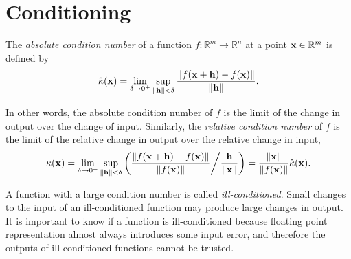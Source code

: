 
\section*{Conditioning} %

The \emph{absolute condition number} of a function $f: \mathbb{R}^m \rightarrow \mathbb{R}^n$ at a point $\mathbf{x}\in\mathbb{R}^m$ is defined by
\begin{equation}
\hat{\kappa} (\mathbf{x}) = \lim_{\delta \rightarrow 0^+} \sup_{\left\lVert\mathbf{h}\right\rVert < \delta} { \frac{\left\lVert f(\mathbf{x} + \mathbf{h} ) - f(\mathbf{x})\right\rVert}{\left\lVert\mathbf{h}\right\rVert} }.
\label{eq:absolute-condition-number}
\end{equation}

In other words, the absolute condition number of $f$ is the limit of the change in output over the change of input.
Similarly, the \emph{relative condition number} of $f$ is the limit of the relative change in output over the relative change in input,
\begin{equation}
\kappa(\mathbf{x})
= \lim_{\delta \rightarrow 0^+} \sup_{\left\lVert\mathbf{h}\right\rVert < \delta} \left({ \frac{\left\lVert f(\mathbf{x} + \mathbf{h} ) - f(\mathbf{x})\right\rVert}{\left\lVert f(\mathbf{x})\right\rVert} } \middle/ { \frac{\left\lVert\mathbf{h}\right\rVert}{\left\lVert\mathbf{x}\right\rVert} }\right)
= \frac{\left\lVert\mathbf{x}\right\rVert}{\left\lVert f(\mathbf{x})\right\rVert} \hat{\kappa}(\mathbf{x}).
\label{eq:relative-condition-number}
\end{equation}

A function with a large condition number is called \emph{ill-conditioned}.
Small changes to the input of an ill-conditioned function may produce large changes in output.
It is important to know if a function is ill-conditioned because floating point representation almost always introduces some input error, and therefore the outputs of ill-conditioned functions cannot be trusted.


